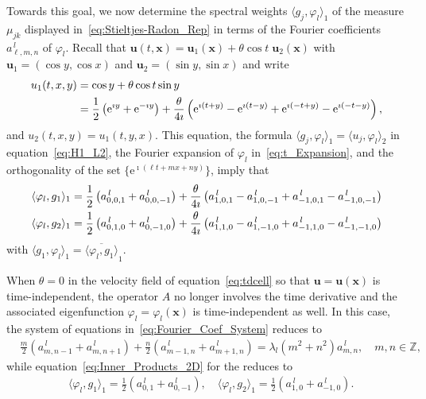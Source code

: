 \documentclass[leqno,onefignum,onetabnum]{siamltex1213}
\newcommand{\e}{\mathrm{e}}
\newcommand{\vecx}{\boldsymbol{x}}
\newcommand{\vecu}{\boldsymbol{u}}
\begin{document}
Towards this goal, we now determine the spectral weights $\langle
g_j,\varphi_l\rangle_1$ of the measure $\mu_{jk}$ displayed
in~\eqref{eq:Stieltjes-Radon_Rep} in terms of the Fourier coefficients
$a^{\,l}_{\ell,m,n}$ of $\varphi_l$. Recall that 
$\vecu(t,\vecx)=\vecu_1(\vecx)+\theta\cos{t}\;\vecu_2(\vecx)$ with  
$\vecu_1=(\cos{y},\cos{x})$ and $\vecu_2=(\sin{y},\sin{x})$ and write
%
\begin{align}
  u_1(t,x,y)&=\cos{y}+\theta\cos{t}\sin{y}\\ 
           &=\frac{1}{2}\left(\e^{\imath y}+\e^{-\imath y}\right)
            +\frac{\theta}{4\imath}\left(\e^{\imath(t+y)}-\e^{\imath(t-y)}+\e^{\imath(-t+y)}-\e^{\imath(-t-y)}\right),
            \notag
\end{align}
%
and $u_2(t,x,y)=u_1(t,y,x)$. This equation, the formula $\langle
g_j,\varphi_l\rangle_1=\langle u_j,\varphi_l\rangle_2$ in equation~\eqref{eq:H1_L2}, the Fourier 
expansion of $\varphi_l$ in~\eqref{eq:t_Expansion}, and the orthogonality of
the set $\{\e^{\imath(\ell t+mx+ny)}\}$, imply that
%
\begin{align}\label{eq:Inner_Products_2D}
  \langle\varphi_l,g_1\rangle_1=\frac{1}{2}\left(a^{\,l}_{0,0,1}+a^{\,l}_{0,0,-1}\right)
               +\frac{\theta}{4\imath}\left(a^{\,l}_{1,0,1}-a^{\,l}_{1,0,-1}+a^{\,l}_{-1,0,1}-a^{\,l}_{-1,0,-1}\right) 
               \\
  \langle\varphi_l,g_2\rangle_1=\frac{1}{2}\left(a^{\,l}_{0,1,0}+a^{\,l}_{0,-1,0}\right)
               +\frac{\theta}{4\imath}\left(a^{\,l}_{1,1,0}-a^{\,l}_{1,-1,0}+a^{\,l}_{-1,1,0}-a^{\,l}_{-1,-1,0}\right)
               \notag
\end{align}
%
with $\langle g_1,\varphi_l\rangle_1=\overline{\langle\varphi_l,g_1\rangle}_1$.



When $\theta=0$ in the velocity field of equation~\eqref{eq:tdcell} so that
$\vecu=\vecu(\vecx)$ is time-independent, the
operator $A$ no longer involves the time derivative and the associated
eigenfunction $\varphi_l=\varphi_l(\vecx)$ is time-independent as well. In this case, the 
system of equations in~\eqref{eq:Fourier_Coef_System} reduces to
%
\begin{align}\label{eq:Fourier_Coef_System_Steady}
  &\frac{m}{2}(a^{\,l}_{m,n-1}+a^{\,l}_{m,n+1})+\frac{n}{2}(a^{\,l}_{m-1,n}+a^{\,l}_{m+1,n})=\lambda_l(m^2+n^2)a^{\,l}_{m,n},
  \quad m,n\in\mathbb{Z},  
\end{align}
%
while equation~\eqref{eq:Inner_Products_2D} for the reduces to
%
\begin{align}\label{eq:Inner_Products_2D_Steady}
  &\langle\varphi_l,g_1\rangle_1=\frac{1}{2}\left(a^{\,l}_{0,1}+a^{\,l}_{0,-1}\right),
  \quad
  \langle\varphi_l,g_2\rangle_1=\frac{1}{2}\left(a^{\,l}_{1,0}+a^{\,l}_{-1,0}\right).
\end{align}
%
\end{document}
